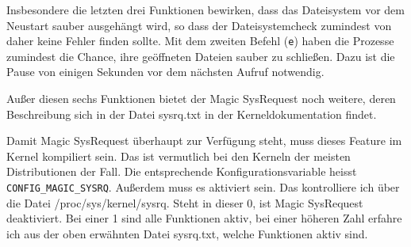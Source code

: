 Insbesondere die letzten drei Funktionen bewirken, dass das Dateisystem vor
dem Neustart sauber ausgehängt wird, so dass der Dateisystemcheck zumindest
von daher keine Fehler finden sollte. Mit dem zweiten Befehl (\verb?e?) haben
die Prozesse zumindest die Chance, ihre geöffneten Dateien sauber zu
schließen. Dazu ist die Pause von einigen Sekunden vor dem nächsten Aufruf
notwendig.

Außer diesen sechs Funktionen bietet der Magic SysRequest noch weitere, deren
Beschreibung sich in der Datei sysrq.txt in der Kerneldokumentation findet.

Damit Magic SysRequest überhaupt zur Verfügung steht, muss dieses Feature im
Kernel kompiliert sein. Das ist vermutlich bei den Kerneln der meisten
Distributionen der Fall. Die entsprechende Konfigurationsvariable heisst
\verb?CONFIG_MAGIC_SYSRQ?. Außerdem muss es aktiviert sein. Das kontrolliere
ich über die Datei /proc/sys/kernel/sysrq. Steht in dieser 0, ist Magic
SysRequest deaktiviert. Bei einer 1 sind alle Funktionen aktiv, bei einer
höheren Zahl erfahre ich aus der oben erwähnten Datei sysrq.txt, welche
Funktionen aktiv sind.
